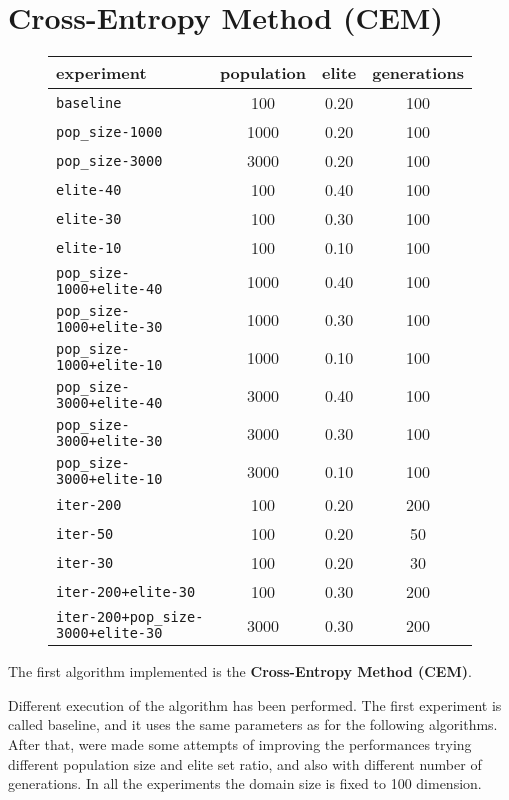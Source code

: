 \section{Cross-Entropy Method (CEM)}
\begin{figure}[H]
	\centering
	
	\begin{tabular}{lccc}
		\toprule
		\textbf{experiment} & \textbf{population} & \textbf{elite} &
		\textbf{generations} \\
		\midrule
		\texttt{baseline 						}	 & 100 	& 0.20 	& 100\\
		\texttt{pop\_size-1000 					}	 & 1000 	& 0.20 	& 100\\
		\texttt{pop\_size-3000 					}	 & 3000 	& 0.20 	& 100\\
		\texttt{elite-40 						}	 & 100 	& 0.40 	& 100\\
		\texttt{elite-30 						}	 & 100 	& 0.30 	& 100\\
		\texttt{elite-10 						}	 & 100 	& 0.10 	& 100\\
		\texttt{pop\_size-1000+elite-40 		}	 & 1000 	& 0.40 	& 100\\
		\texttt{pop\_size-1000+elite-30 		}	 & 1000 	& 0.30 	& 100\\
		\texttt{pop\_size-1000+elite-10 		}	 & 1000 	& 0.10 	& 100\\
		\texttt{pop\_size-3000+elite-40 		}	 & 3000 	& 0.40 	& 100\\
		\texttt{pop\_size-3000+elite-30 		}	 & 3000 	& 0.30 	& 100\\
		\texttt{pop\_size-3000+elite-10 		}	 & 3000 	& 0.10 	& 100\\
		\texttt{iter-200 						}	 & 100 	& 0.20 	& 200\\
		\texttt{iter-50 						}	 & 100 	& 0.20 	& 50\\
		\texttt{iter-30 						}	 & 100 	& 0.20 	& 30\\
		\texttt{iter-200+elite-30 				}	 & 100 	& 0.30 	& 200\\
		\texttt{iter-200+pop\_size-3000+elite-30} 	 & 3000 	& 0.30 	& 200\\	
		\bottomrule
	\end{tabular}
	\label{tab:cem-param}
\end{figure}

The first algorithm implemented is the \textbf{Cross-Entropy Method (CEM)}. 

Different execution of the algorithm has been performed. The first experiment is called baseline, and it uses the same parameters as for the following algorithms. After that, were made some attempts of improving the performances trying different population size and elite set ratio, and also with different number of generations. In all the experiments the domain size is fixed to 100 dimension.

